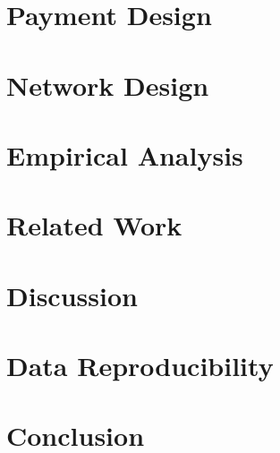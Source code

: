 \documentclass[USenglish,oneside,twocolumn]{article}
\begin{document}
%
%

\section{Payment Design}
\label{sec:payment}


\section{Network Design}
\label{sec:network}


\section{Empirical Analysis}
\label{sec:analysis}


\section{Related Work}
\label{sec:related_work}


%

\section{Discussion}


\section{Data Reproducibility}
\label{sec:code}


\section{Conclusion}
\label{sec:conclusion}


\end{document}
